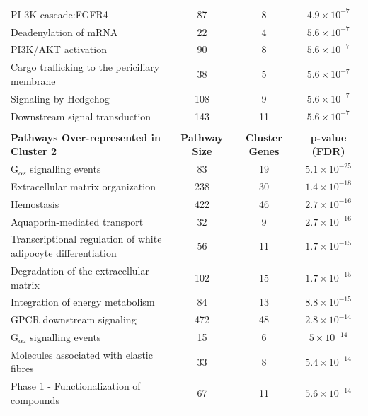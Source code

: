 \begin{table}[!Hp]
{\begin{tabular}{lccc}
  PI-3K cascade:FGFR4 &  87 &   8 & $4.9 \times 10^{-7}$ \\ 
  \rowcolor{Cluster_Blue!15} 
  Deadenylation of mRNA &  22 &   4 & $5.6 \times 10^{-7}$ \\ 
  \rowcolor{Cluster_Blue!20} 
  PI3K/AKT activation &  90 &   8 & $5.6 \times 10^{-7}$ \\ 
  \rowcolor{Cluster_Blue!15} 
  Cargo trafficking to the periciliary membrane &  38 &   5 & $5.6 \times 10^{-7}$ \\ 
  \rowcolor{Cluster_Blue!20} 
  Signaling by Hedgehog & 108 &   9 & $5.6 \times 10^{-7}$ \\ 
  \rowcolor{Cluster_Blue!15} 
  Downstream signal transduction & 143 &  11 & $5.6 \times 10^{-7}$ \\ 
  \hline
  \\
  \cellcolor{white} \large{\textbf{Pathways Over-represented in Cluster 2}} & \large{\textbf{Pathway Size}} & \large{\textbf{Cluster Genes}} & \large{\textbf{p-value (FDR)}} \\ %
  \hline
  \rowcolor{Cluster_Green!20}
  G$_{\alpha s}$ signalling events &  83 &  19 & $5.1 \times 10^{-25}$ \\ 
  \rowcolor{Cluster_Green!15}
  Extracellular matrix organization & 238 &  30 & $1.4 \times 10^{-18}$ \\ 
  \rowcolor{Cluster_Green!20} 
  Hemostasis & 422 &  46 & $2.7 \times 10^{-16}$ \\ 
  \rowcolor{Cluster_Green!15} 
  Aquaporin-mediated transport &  32 &   9 & $2.7 \times 10^{-16}$ \\ 
  \rowcolor{Cluster_Green!20} 
  Transcriptional regulation of white adipocyte differentiation &  56 &  11 & $1.7 \times 10^{-15}$ \\ 
  \rowcolor{Cluster_Green!15} 
  Degradation of the extracellular matrix & 102 &  15 & $1.7 \times 10^{-15}$ \\ 
  \rowcolor{Cluster_Green!20} 
  Integration of energy metabolism &  84 &  13 & $8.8 \times 10^{-15}$ \\ 
  \rowcolor{Cluster_Green!15} 
  GPCR downstream signaling & 472 &  48 & $2.8 \times 10^{-14}$ \\ 
  \rowcolor{Cluster_Green!20} 
  G$_{\alpha z}$ signalling events &  15 &   6 & $5 \times 10^{-14}$ \\ 
  \rowcolor{Cluster_Green!15} 
  Molecules associated with elastic fibres &  33 &   8 & $5.4 \times 10^{-14}$ \\ 
  \rowcolor{Cluster_Green!20} 
  Phase 1 - Functionalization of compounds &  67 &  11 & $5.6 \times 10^{-14}$ \\ 

\end{tabular}}
\end{table}
